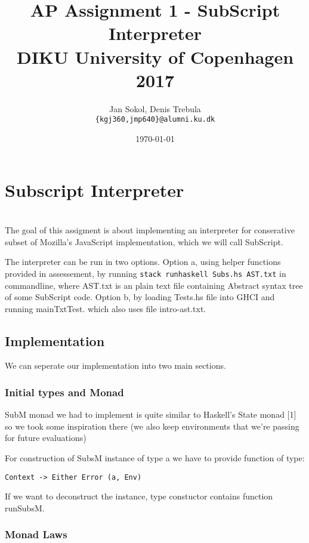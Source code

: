 \documentclass[11pt]{article}
\title{
  \vspace{3cm}
  \Huge{AP Assignment 1 - SubScript Interpreter} \\
  \Large{DIKU University of Copenhagen 2017}
}
\author{
  \Large{Jan Sokol, Denis Trebula}
  \\ \texttt{\{kgj360,jmp640\}@alumni.ku.dk} \\
}
\date{
    \today
}
\def \ColourPDF {include/ku-farve}
\def \TitlePDF   {include/ku-en}  %
\begin{document}


\clearpage\maketitle
\thispagestyle{empty}

\newpage

\section{Subscript Interpreter} \\
The goal of this assigment is about implementing an interpreter for conserative subset of Mozilla's JavaScript implementation, which
we will call SubScript.

The interpreter can be run in two options. Option a, using helper functions provided in assessement, by running \texttt{stack runhaskell Subs.hs AST.txt} in commandline, where AST.txt is an plain text file containing Abstract syntax tree of some SubScript code.
Option b, by loading Tests.hs file into GHCI and running mainTxtTest. which also uses file intro-ast.txt.

\subsection{Implementation}
We can seperate our implementation into two main sections.

\subsubsection{Initial types and Monad}
SubM monad we had to implement is quite similar to Haskell's State monad [1] so we took some inspiration there (we also keep environments that we're passing for future evaluations)

For construction of SubsM instance of type a we have to provide function of type:
\begin{verbatim}
Context -> Either Error (a, Env)
\end{verbatim} 
If we want to deconstruct the instance, type constuctor contains function runSubsM. 

\subsubsection{Monad Laws}
\end{document}
